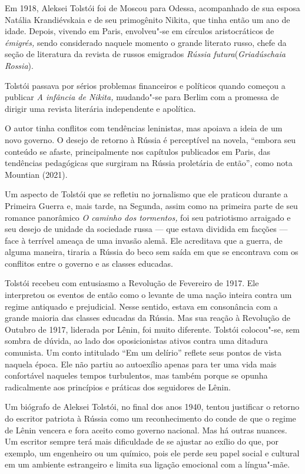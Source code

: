 \documentclass[11pt]{extarticle}
\begin{document}
Em 1918, Aleksei Tolstói foi de Moscou para Odessa, acompanhado de sua
esposa Natália Krandiévskaia e de seu primogênito Nikita, que tinha
então um ano de idade. Depois, vivendo em Paris, envolveu"-se em círculos
aristocráticos de \emph{émigrés,} sendo considerado naquele momento o
grande literato russo, chefe da seção de literatura da revista de russos
emigrados \emph{Rússia futura}(\emph{Griadúschaia Rossia}).

Tolstói passava por sérios problemas financeiros e políticos quando
começou a publicar \emph{A infância de Nikita,} mudando"-se para Berlim
com a promessa de dirigir uma revista literária independente e
apolítica.

O autor tinha conflitos com tendências leninistas, mas apoiava a ideia
de um novo governo. O desejo de retorno à Rússia é perceptível na
novela, ``embora seu conteúdo se afaste, principalmente nos capítulos
publicados em Paris, das tendências pedagógicas que surgiram na Rússia
proletária de então'', como nota Mountian (2021).

Um aspecto de Tolstói que se refletiu no jornalismo que ele praticou
durante a Primeira Guerra e, mais tarde, na Segunda, assim como na
primeira parte de seu romance panorâmico \emph{O caminho dos tormentos,}
foi seu patriotismo arraigado e seu desejo de unidade da sociedade russa
--- que estava dividida em facções --- face à terrível ameaça de uma
invasão alemã. Ele acreditava que a guerra, de alguma maneira, tiraria a
Rússia do beco sem saída em que se encontrava com os conflitos entre o
governo e as classes educadas.

Tolstói recebeu com entusiasmo a Revolução de Fevereiro de 1917. Ele
interpretou os eventos de então como o levante de uma nação inteira
contra um regime antiquado e prejudicial. Nesse sentido, estava em
consonância com a grande maioria das classes educadas da Rússia. Mas sua
reação à Revolução de Outubro de 1917, liderada por Lênin, foi muito
diferente. Tolstói colocou"-se, sem sombra de dúvida, ao lado dos
oposicionistas ativos contra uma ditadura comunista. Um conto intitulado
``Em um delírio'' reflete seus pontos de vista naquela época. Ele não
partiu ao autoexílio apenas para ter uma vida mais confortável naqueles
tempos turbulentos, mas também porque se opunha radicalmente aos
princípios e práticas dos seguidores de Lênin.

Um biógrafo de Aleksei Tolstói, no final dos anos 1940, tentou
justificar o retorno do escritor patriota à Rússia como um
reconhecimento do conde de que o regime de Lênin vencera e fora aceito
como governo nacional. Mas há outras nuances. Um escritor sempre terá
mais dificuldade de se ajustar ao exílio do que, por exemplo, um
engenheiro ou um químico, pois ele perde seu papel social e cultural em
um ambiente estrangeiro e limita sua ligação emocional com a língua"-mãe.
\end{document}
